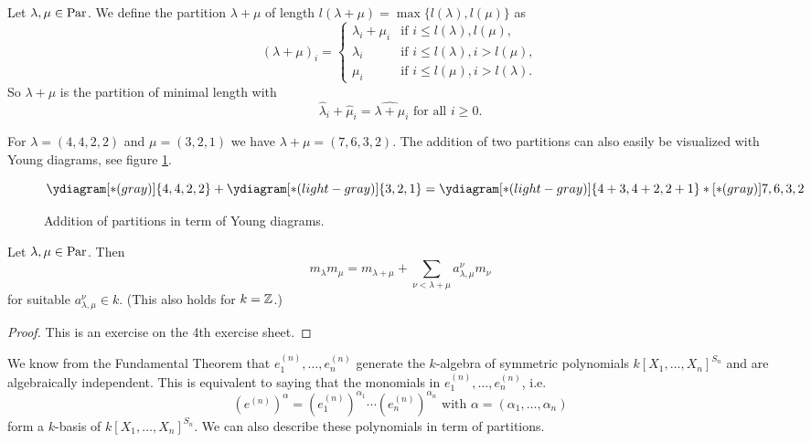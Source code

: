 \begin{defi}
 Let $\lambda, \mu \in \operatorname{Par}$. We define the partition $\lambda+\mu$ of length $l(\lambda+\mu) = \max\{ l(\lambda), l(\mu) \}$ as
 \[
  (\lambda+\mu)_i =
  \begin{cases}
   \lambda_i + \mu_i & \text{if } i \leq l(\lambda),l(\mu), \\
   \lambda_i         & \text{if } i \leq l(\lambda), i > l(\mu), \\
   \mu_i             & \text{if } i \leq l(\mu), i > l(\lambda).
  \end{cases}
 \]
 So $\lambda+\mu$ is the partition of minimal length with
 \[
  \hat{\lambda}_i + \hat{\mu}_i = \widehat{\lambda+\mu}_i \text{ for all } i \geq 0.
 \]
\end{defi}


\begin{expl}
 For $\lambda = (4,4,2,2)$ and $\mu = (3,2,1)$ we have $\lambda+\mu = (7,6,3,2)$. The addition of two partitions can also easily be visualized with Young diagrams, see figure \ref{fig: addition partition young diagrams}.
 \begin{figure}\centering
  \[
   \ydiagram[*(gray)]{4,4,2,2} + \ydiagram[*(light-gray)]{3,2,1}
   = \ydiagram[*(light-gray)] {4+3,4+2,2+1} *[*(gray)]{7,6,3,2}
  \]
  \caption{Addition of partitions in term of Young diagrams.}
  \label{fig: addition partition young diagrams}
 \end{figure}
\end{expl}


\begin{lem}
 Let $\lambda, \mu \in \operatorname{Par}$. Then
 \[
  m_{\lambda} m_{\mu} = m_{\lambda + \mu} + \sum_{\nu < \lambda + \mu} a^\nu_{\lambda,\mu} m_\nu
 \]
 for suitable $a^\nu_{\lambda,\mu} \in k$. (This also holds for $k = \mathbb{Z}$.)
\end{lem}
\begin{proof}
 This is an exercise on the 4th exercise sheet.
\end{proof}


We know from the Fundamental Theorem that $e^{(n)}_1, \ldots, e^{(n)}_n$ generate the $k$-algebra of symmetric polynomials $k[X_1, \ldots, X_n]^{S_n}$ and are algebraically independent. This is equivalent to saying that the monomials in $e^{(n)}_1, \ldots, e^{(n)}_n$, i.e.
\[
 \left( e^{(n)} \right)^\alpha = \left(e^{(n)}_1\right)^{\alpha_1} \cdots \left(e^{(n)}_n\right)^{\alpha_n} \text{ with } \alpha = (\alpha_1, \ldots, \alpha_n)
\]
form a $k$-basis of $k[X_1, \ldots, X_n]^{S_n}$. We can also describe these polynomials in term of partitions.


